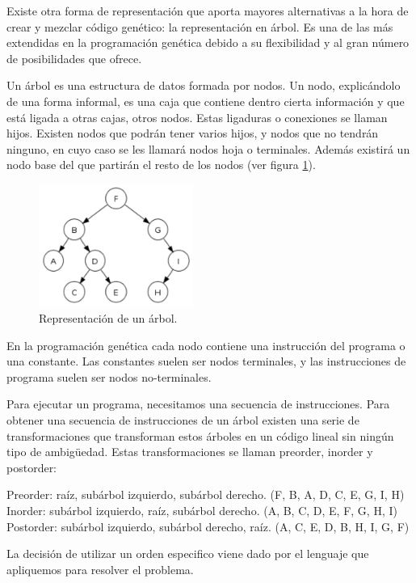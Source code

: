 Existe otra forma de representación que aporta mayores alternativas a la hora de
crear y mezclar código genético: la representación en árbol. Es una de las más
extendidas en la programación genética debido a su flexibilidad y al gran número
de posibilidades que ofrece.

Un árbol es una estructura de datos formada por nodos. Un nodo, explicándolo de
una forma informal, es una caja que contiene dentro cierta información y que está
ligada a otras cajas, otros nodos. Estas ligaduras o conexiones se llaman hijos.
Existen nodos que podrán tener varios hijos, y nodos que no tendrán ninguno, en
cuyo caso se les llamará nodos hoja o terminales. Además existirá un nodo base
del que partirán el resto de los nodos (ver figura \ref{fig:arbol}).

\begin{figure}[t] \centering
\includegraphics[width=0.45\textwidth]{figs/arbol}
\caption{Representación de un árbol.}
\label{fig:arbol}
\end{figure}

En la programación genética cada nodo contiene una instrucción del programa o una
constante. Las constantes suelen ser nodos terminales, y las instrucciones de
programa suelen ser nodos no-terminales.

Para ejecutar un programa, necesitamos una secuencia de instrucciones. Para
obtener una secuencia de instrucciones de un árbol existen una serie de
transformaciones que transforman estos árboles en un código lineal sin ningún
tipo de ambigüedad. Estas transformaciones se llaman preorder, inorder y
postorder:

Preorder: raíz, subárbol izquierdo, subárbol derecho. (F, B, A, D, C, E, G, I, H)
Inorder: subárbol izquierdo, raíz, subárbol derecho. (A, B, C, D, E, F, G, H, I)
Postorder: subárbol izquierdo, subárbol derecho, raíz. (A, C, E, D, B, H, I, G,
F)


La decisión de utilizar un orden especifico viene dado por el lenguaje que
apliquemos para resolver el problema.

